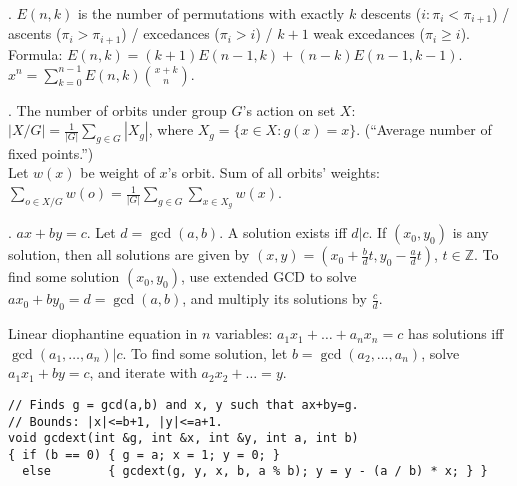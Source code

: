 
.
$E(n,k)$ is the number of permutations with exactly
$k$ descents ($i: \pi_i < \pi_{i+1}$) /
ascents ($\pi_i > \pi_{i+1}$) /
excedances ($\pi_i > i$) /
$k+1$ weak excedances ($\pi_i \ge i$). \\
Formula: $E(n,k)=(k+1)E(n-1,k)+(n-k)E(n-1,k-1)$. \quad
$x^n = \sum_{k=0}^{n-1} E(n,k) {x+k \choose n}$.

.
The number of orbits under group $G$'s action on set $X$:\\
$|X/G| = \frac{1}{|G|} \sum_{g \in G} |X_g|$,
where $X_g=\{ x \in X: g(x)=x \}$. (``Average number of fixed points.'') \\
Let $w(x)$ be weight of $x$'s orbit. Sum of all orbits' weights:
$\sum_{o \in X/G} w(o) = \frac{1}{|G|} \sum_{g \in G} \sum_{x \in X_g} w(x)$.





. $ax+by=c$.
Let $d=\gcd(a,b)$. A solution exists iff $d|c$.
If $(x_0,y_0)$ is any solution, then all solutions are given by
$(x,y) = (x_0 + \frac{b}{d}t, y_0 - \frac{a}{d}t)$, $t \in {\mathbb Z}$.
To find some solution $(x_0, y_0)$, use extended GCD to solve
$ax_0 + by_0 = d = \gcd(a, b)$, and multiply its solutions by $\frac{c}{d}$.

Linear diophantine equation in $n$ variables:
$a_1 x_1 + \dots + a_n x_n = c$ has solutions iff $\gcd(a_1, \dots, a_n) | c$.
To find some solution, let $b=\gcd(a_2, \dots, a_n)$,
solve $a_1 x_1 + by = c$, and iterate with $a_2 x_2 + \dots = y$.

\vspace{-5mm}
\begin{verbatim}
// Finds g = gcd(a,b) and x, y such that ax+by=g.
// Bounds: |x|<=b+1, |y|<=a+1.
void gcdext(int &g, int &x, int &y, int a, int b)
{ if (b == 0) { g = a; x = 1; y = 0; }
  else        { gcdext(g, y, x, b, a % b); y = y - (a / b) * x; } }
\end{verbatim}
\vspace{-3mm}

